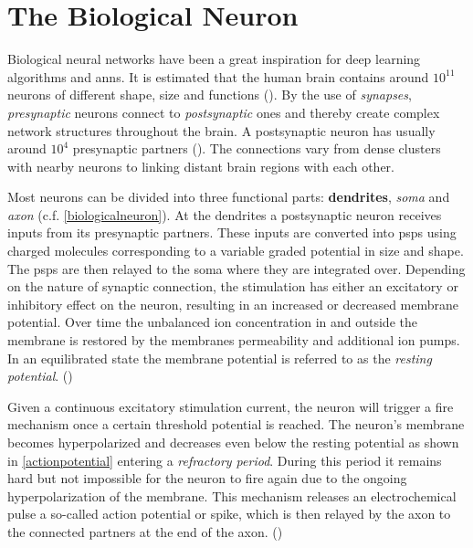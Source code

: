 
\section{The Biological Neuron}

Biological neural networks have been a great inspiration for deep learning algorithms and \glspl{ann}. It is estimated that the human brain contains around $10^{11}$ neurons of different shape, size and functions (\citealp{numberofneurons}). By the use of \emph{synapses}, \emph{presynaptic} neurons connect to \emph{postsynaptic} ones and thereby create complex network structures throughout the brain. A postsynaptic neuron has usually around $10^4$ presynaptic partners (\citealp{numberofsynapses}). The connections vary from dense clusters with nearby neurons to linking distant brain regions with each other. 

Most neurons can be divided into three functional parts: \textbf{dendrites}, \emph{soma} and \emph{axon} (c.f. \cref{biologicalneuron}). At the dendrites a postsynaptic neuron receives inputs from its presynaptic partners. These inputs are converted into \glspl{psp} using charged molecules corresponding to a variable graded potential in size and shape. The \glspl{psp} are then relayed to the soma where they are integrated over. Depending on the nature of synaptic connection, the stimulation has either an excitatory or inhibitory effect on the neuron, resulting in an increased or decreased membrane potential. Over time the unbalanced ion concentration in and outside the membrane is restored by the membranes permeability and additional ion pumps. In an equilibrated state the membrane potential is referred to as the \emph{resting potential}. (\citealp{gerstner2014dynamics})

Given a continuous excitatory stimulation current, the neuron will trigger a fire mechanism once a certain threshold potential is reached. The neuron's membrane becomes hyperpolarized and decreases even below the resting potential as shown in \cref{actionpotential} entering a \emph{refractory period}. During this period it remains hard but not impossible for the neuron to fire again due to the ongoing hyperpolarization of the membrane. This mechanism releases an electrochemical pulse a so-called action potential or spike, which is then relayed by the axon to the connected partners at the end of the axon. (\citealp{gerstner2014dynamics})

